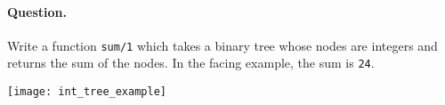 \paragraph{Question.}
\begin{multicols}{2}
Write a function \texttt{sum/1} which takes a
binary tree whose nodes are integers and returns the sum of the
nodes. In the facing example, the sum is \texttt{24}.
\par\vfill\columnbreak
\begin{center}
\texttt{[image: int\_tree\_example]}
\end{center}
\end{multicols}


